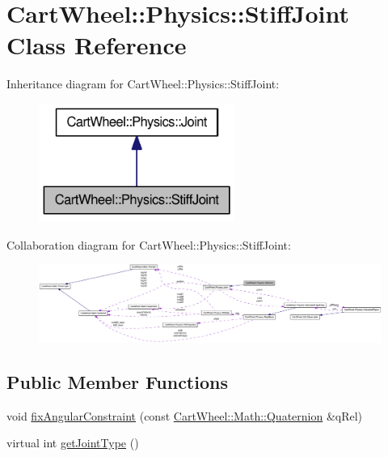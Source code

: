 \hypertarget{classCartWheel_1_1Physics_1_1StiffJoint}{
\section{CartWheel::Physics::StiffJoint Class Reference}
\label{classCartWheel_1_1Physics_1_1StiffJoint}
}


Inheritance diagram for CartWheel::Physics::StiffJoint:\nopagebreak
\begin{figure}[H]
\begin{center}
\leavevmode
\includegraphics[width=182pt]{classCartWheel_1_1Physics_1_1StiffJoint__inherit__graph}
\end{center}
\end{figure}


Collaboration diagram for CartWheel::Physics::StiffJoint:\nopagebreak
\begin{figure}[H]
\begin{center}
\leavevmode
\includegraphics[width=400pt]{classCartWheel_1_1Physics_1_1StiffJoint__coll__graph}
\end{center}
\end{figure}
\subsection*{Public Member Functions}
\begin{DoxyCompactItemize}
\item 
void \hyperlink{classCartWheel_1_1Physics_1_1StiffJoint_a85fb008cc0917d1f2fd7c6d6fbda4331}{fixAngularConstraint} (const \hyperlink{classCartWheel_1_1Math_1_1Quaternion}{CartWheel::Math::Quaternion} \&qRel)
\item 
virtual int \hyperlink{classCartWheel_1_1Physics_1_1StiffJoint_acc1db8ea3775d137500c15daf8921766}{getJointType} ()
\end{DoxyCompactItemize}


